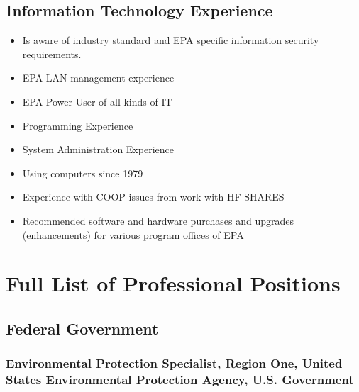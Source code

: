 \documentclass[12pt]{article}
\begin{document}
\subsection{Information Technology Experience}
\begin{itemize}

\item Is aware of industry standard and EPA specific information security requirements.
\item EPA LAN management experience
\item EPA Power User of all kinds of IT
\item Programming Experience
\item System Administration Experience
\item Using computers since 1979
\item Experience with COOP issues from work with HF SHARES
\item Recommended software and hardware purchases and upgrades (enhancements) for various program offices of EPA
   
\end{itemize}


\section{Full List of Professional Positions}

\subsection {Federal Government}
\subsubsection{Environmental Protection Specialist, Region One,
United States Environmental Protection Agency, U.S. Government}
\end{document}
